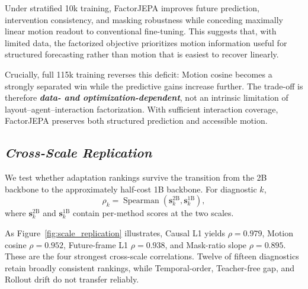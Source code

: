 Under stratified 10k training, FactorJEPA improves future prediction,
intervention consistency, and masking robustness while conceding maximally
linear motion readout to conventional fine-tuning. This suggests that, with
limited data, the factorized objective prioritizes motion information useful
for structured forecasting rather than motion that is easiest to recover
linearly.

Crucially, full 115k training reverses this deficit: Motion cosine becomes a
strongly separated win while the predictive gains increase further. The
trade-off is therefore \textbf{\emph{data- and optimization-dependent}}, not an
intrinsic limitation of layout--agent--interaction factorization. With
sufficient interaction coverage, FactorJEPA preserves both structured
prediction and accessible motion.

\subsection{\textbf{\emph{Cross-Scale Replication}}}

We test whether adaptation rankings survive the transition from the 2B backbone
to the approximately half-cost 1B backbone. For diagnostic $k$,
\begin{equation*}
\rho_k
=
\operatorname{Spearman}
\left(
\mathbf s_k^{2\mathrm B},
\mathbf s_k^{1\mathrm B}
\right),
\end{equation*}
where $\mathbf s_k^{2\mathrm B}$ and $\mathbf s_k^{1\mathrm B}$ contain
per-method scores at the two scales.

As Figure~\ref{fig:scale_replication} illustrates, Causal L1 yields
$\rho=0.979$, Motion cosine $\rho=0.952$, Future-frame L1
$\rho=0.938$, and Mask-ratio slope $\rho=0.895$. These are the four strongest
cross-scale correlations. Twelve of fifteen diagnostics retain broadly
consistent rankings, while Temporal-order, Teacher-free gap, and Rollout drift
do not transfer reliably.

